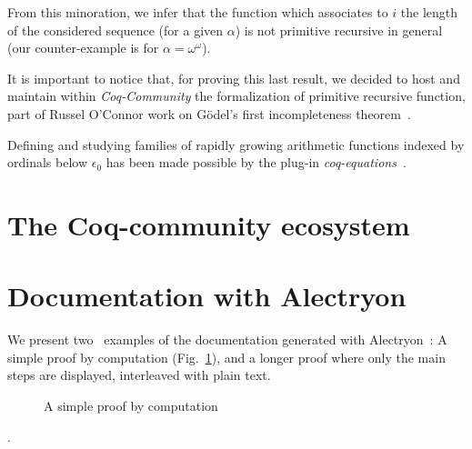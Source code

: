 \documentclass{easychair}
\makeatletter
\newcommand{\inputsnippets}[1]
  {{\setlength{\itemsep}{1pt}\setlength{\parsep}{0pt}%
    \alectryon@copymacros\begin{io}
      \forcsvlist{\item\@inputsnippet}{#1}
    \end{io}}}
\let@old Save definition of 
\newcommand{\@inputsnippet}[1]
  {{\renewenvironment{alectryon}{}{}%
    @old{../movies/snippets/#1}}}
\makeatother
\begin{document}
From this minoration, we infer that the function which associates to $i$ the length of the considered sequence (for a given $\alpha$) is not primitive recursive in general (our counter-example is for $\alpha=\omega^\omega$).

It is important to notice that, for proving this last result, we decided to host and maintain within \emph{Coq-Community} the formalization of primitive recursive function, part of Russel O'Connor work on G\"{o}del's first incompleteness theorem~\cite{OConnor05}.

Defining and studying families of rapidly growing arithmetic  functions indexed by ordinals below $\epsilon_0$ has been made possible by the plug-in \emph{coq-equations}~\cite{sozeau:hal-01671777}.


\section{The Coq-community ecosystem}


\section{Documentation with Alectryon}

We present two ~examples of the documentation generated with Alectryon~\cite{alectryonpaper}: A simple proof by computation (Fig.~\ref{fig:Ex42E0}), and a longer proof where only the main steps are displayed, interleaved with plain text.

  \begin{figure}[h]
    \centering
    \fbox{
      \begin{minipage}[h]{1.0\linewidth}
        \inputsnippets{E0/Ex42}
      \end{minipage}}
    \caption{A simple proof by computation}
    \label{fig:Ex42E0}
  \end{figure}
\label{Ex42-E0}.


\end{document}

